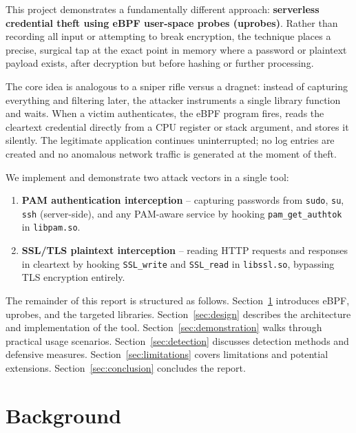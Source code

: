 \documentclass[11pt,a4paper]{article}
\begin{document}
This project demonstrates a fundamentally different approach:
\textbf{serverless credential theft using eBPF user-space probes (uprobes)}.
Rather than recording all input or attempting to break encryption, the technique
places a precise, surgical tap at the exact point in memory where a password or
plaintext payload exists, after decryption but before hashing or further
processing.

The core idea is analogous to a sniper rifle versus a dragnet: instead of
capturing everything and filtering later, the attacker instruments a single
library function and waits. When a victim authenticates, the eBPF program
fires, reads the cleartext credential directly from a CPU register or stack
argument, and stores it silently. The legitimate application continues
uninterrupted; no log entries are created and no anomalous network traffic is
generated at the moment of theft.

We implement and demonstrate two attack vectors in a single tool:

\begin{enumerate}
    \item \textbf{PAM authentication interception} -- capturing passwords from
          \texttt{sudo}, \texttt{su}, \texttt{ssh} (server-side), and any
          PAM-aware service by hooking \texttt{pam\_get\_authtok} in
          \texttt{libpam.so}.
    \item \textbf{SSL/TLS plaintext interception} -- reading HTTP requests and
          responses in cleartext by hooking \texttt{SSL\_write} and
          \texttt{SSL\_read} in \texttt{libssl.so}, bypassing TLS encryption
          entirely.
\end{enumerate}

The remainder of this report is structured as follows.
Section~\ref{sec:background} introduces eBPF, uprobes, and the targeted
libraries. Section~\ref{sec:design} describes the architecture and
implementation of the tool. Section~\ref{sec:demonstration} walks through
practical usage scenarios. Section~\ref{sec:detection} discusses detection
methods and defensive measures. Section~\ref{sec:limitations} covers
limitations and potential extensions. Section~\ref{sec:conclusion} concludes
the report.


\section{Background}
\label{sec:background}
\end{document}
